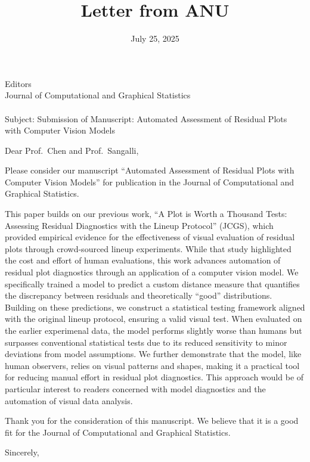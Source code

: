 \documentclass[
  12pt,
  letterpaper]{letter}
\title{Letter from ANU}
\author{\hspace{0pt}}
\date{July 25, 2025}
\begin{document}


\signature{
\hspace{0pt}}
\address{Australian National University\\Research School of Finance,
Actuarial Studies and Statistics\\26C Kingsley
Street\\Canberra 2600\\Australia\\[2mm]}
\begin{letter}{Editors\\Journal of Computational and Graphical
Statistics\\ ~ \\Subject: Submission of Manuscript: Automated Assessment
of Residual Plots with Computer Vision Models}
\opening{Dear Prof.~Chen and Prof.~Sangalli,}


Please consider our manuscript ``Automated Assessment of Residual Plots
with Computer Vision Models'' for publication in the Journal of
Computational and Graphical Statistics.

This paper builds on our previous work, ``A Plot is Worth a Thousand
Tests: Assessing Residual Diagnostics with the Lineup Protocol'' (JCGS),
which provided empirical evidence for the effectiveness of visual
evaluation of residual plots through crowd-sourced lineup experiments.
While that study highlighted the cost and effort of human evaluations,
this work advances automation of residual plot diagnostics through an
application of a computer vision model. We specifically trained a model
to predict a custom distance measure that quantifies the discrepancy
between residuals and theoretically ``good'' distributions. Building on
these predictions, we construct a statistical testing framework aligned
with the original lineup protocol, ensuring a valid visual test. When
evaluated on the earlier experimenal data, the model performs slightly
worse than humans but surpasses conventional statistical tests due to
its reduced sensitivity to minor deviations from model assumptions. We
further demonstrate that the model, like human observers, relies on
visual patterns and shapes, making it a practical tool for reducing
manual effort in residual plot diagnostics. This approach would be of
particular interest to readers concerned with model diagnostics and the
automation of visual data analysis.

Thank you for the consideration of this manuscript. We believe that it
is a good fit for the Journal of Computational and Graphical Statistics.



\closing{Sincerely,}
\vfill
\end{letter}
\end{document}

